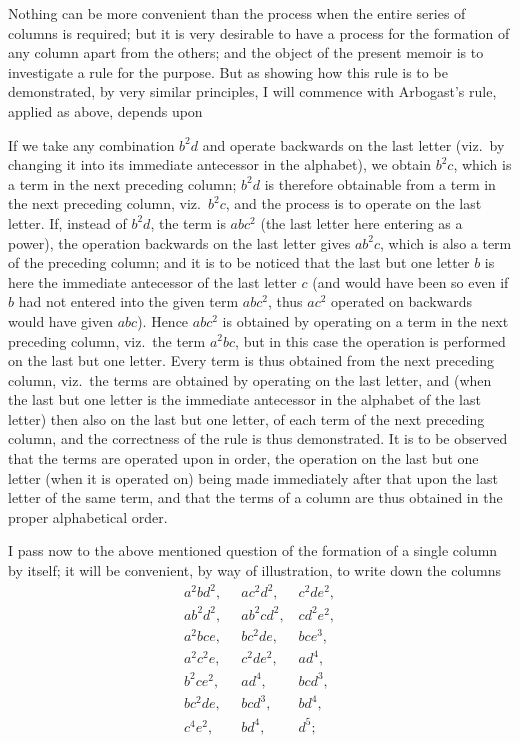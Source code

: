 \documentclass[11pt]{article}
\begin{document}
\noindent Nothing can be more convenient than the process when the entire series of columns is required; but it is very desirable to have a process for the formation of any column apart from the others; and the object of the present memoir is to investigate a rule for the purpose. But as showing how this rule is to be demonstrated, by very similar principles, I will commence with Arbogast's rule, applied as above, depends upon

\medskip

\noindent If we take any combination $b^2 d$ and operate backwards on the last letter (viz.\ by changing it into its immediate antecessor in the alphabet), we obtain $b^2 c$, which is a term in the next preceding column; $b^2 d$ is therefore obtainable from a term in the next preceding column, viz.\ $b^2 c$, and the process is to operate on the last letter. If, instead of $b^2 d$, the term is $a b c^2$ (the last letter here entering as a power), the operation backwards on the last letter gives $a b^2 c$, which is also a term of the preceding column; and it is to be noticed that the last but one letter $b$ is here the immediate antecessor of the last letter $c$ (and would have been so even if $b$ had not entered into the given term $a b c^2$, thus $a c^2$ operated on backwards would have given $a b c$). Hence $a b c^2$ is obtained by operating on a term in the next preceding column, viz.\ the term $a^2 b c$, but in this case the operation is performed on the last but one letter. Every term is thus obtained from the next preceding column, viz.\ the terms are obtained by operating on the last letter, and (when the last but one letter is the immediate antecessor in the alphabet of the last letter) then also on the last but one letter, of each term of the next preceding column, and the correctness of the rule is thus demonstrated. It is to be observed that the terms are operated upon in order, the operation on the last but one letter (when it is operated on) being made immediately after that upon the last letter of the same term, and that the terms of a column are thus obtained in the proper alphabetical order.

\medskip

\noindent I pass now to the above mentioned question of the formation of a single column by itself; it will be convenient, by way of illustration, to write down the columns
\[
\begin{array}{lll}
   a^2 b d^2,\;\; & a c^2 d^2,\;\; & c^2 d e^2,\\
   a b^2 d^2,    & a b^2 c d^2,  & c d^2 e^2,\\
   a^2 b c e,    & b c^2 d e,    & b c e^3,\\
   a^2 c^2 e,    & c^2 d e^2,    & a d^4,\\
   b^2 c e^2,    & a d^4,        & b c d^3,\\
   b c^2 d e,    & b c d^3,      & b d^4,\\
   c^4 e^2,      & b d^4,        & d^5;
\end{array}
\]
\end{document}
